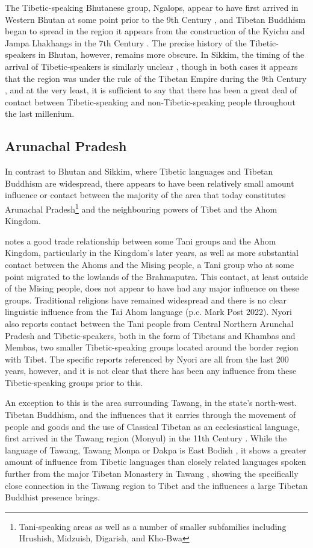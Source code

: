 The Tibetic-speaking Bhutanese group, Ngalops, appear to have first arrived in Western Bhutan at some point prior to the 9th Century \cite{VanDriem2001b}, and Tibetan Buddhism began to spread in the region it appears from the construction of the Kyichu and Jampa Lhakhangs in the 7th Century \cite{Phuntsho2014}. The precise history of the Tibetic-speakers in Bhutan, however, remains more obscure. In Sikkim, the timing of the arrival of Tibetic-speakers is similarly unclear \cites{Spengen2010}{Yliniemi2021}, though in both cases it appears that the region was under the rule of the Tibetan Empire during the 9th Century \cite{Schaik2013}, and at the very least, it is sufficient to say that there has been a great deal of contact between Tibetic-speaking and non-Tibetic-speaking people throughout the last millenium.

\subsection{Arunachal Pradesh}\label{ss:History:Arunachal}
In contrast to Bhutan and Sikkim, where Tibetic languages and Tibetan Buddhism are widespread, there appears to have been relatively small amount influence or contact between the majority of the area that today constitutes Arunachal Pradesh\footnote{Tani-speaking areas as well as a number of smaller subfamilies including Hrushish, Midzuish, Digarish, and Kho-Bwa} and the neighbouring powers of Tibet and the Ahom Kingdom. 

 notes a good trade relationship between some Tani groups and the Ahom Kingdom, particularly in the Kingdom's later years, as well as more substantial contact between the Ahoms and the Mising people, a Tani group who at some point migrated to the lowlands of the Brahmaputra. This contact, at least outside of the Mising people, does not appear to have had any major influence on these groups. Traditional religions have remained widespread and there is no clear linguistic influence from the Tai Ahom language (p.c. Mark Post 2022). Nyori also reports contact between the Tani people from Central Northern Arunchal Pradesh and Tibetic-speakers, both in the form of Tibetans and Khambas and Membas, two smaller Tibetic-speaking groups located around the border region with Tibet. The specific reports referenced by Nyori are all from the last 200 years, however, and it is not clear that there has been any influence from these Tibetic-speaking groups prior to this.

An exception to this is the area surrounding Tawang, in the state's north-west. Tibetan Buddhism, and the influences that it carries through the movement of people and goods and the use of Classical Tibetan as an ecclesiastical language, first arrived in the Tawang region (Monyul) in the 11th Century \cite{Namgyal2020}. While the language of Tawang, Tawang Monpa or Dakpa is East Bodish \cite{Tombleson2020}, it shows a greater amount of influence from Tibetic languages than closely related languages spoken further from the major Tibetan Monastery in Tawang \cite{vanDriem2007}, showing the specifically close connection in the Tawang region to Tibet and the influences a large Tibetan Buddhist presence brings.

